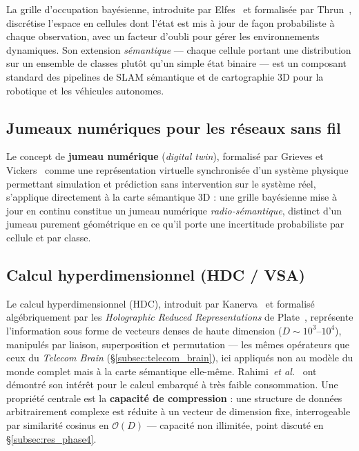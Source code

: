 \documentclass[12pt,a4paper,titlepage]{article}
\begin{document}
La grille d'occupation bayésienne, introduite par Elfes~\cite{elfes_occupancy} et formalisée par Thrun~\cite{thrun_occupancy}, discrétise l'espace en cellules dont l'état est mis à jour de façon probabiliste à chaque observation, avec un facteur d'oubli pour gérer les environnements dynamiques. Son extension \textit{sémantique} --- chaque cellule portant une distribution sur un ensemble de classes plutôt qu'un simple état binaire --- est un composant standard des pipelines de SLAM sémantique et de cartographie 3D pour la robotique et les véhicules autonomes.

\subsection{Jumeaux numériques pour les réseaux sans fil}
\label{subsec:art_twin}

Le concept de \textbf{jumeau numérique} (\textit{digital twin}), formalisé par Grieves et Vickers~\cite{grieves_digital_twin} comme une représentation virtuelle synchronisée d'un système physique permettant simulation et prédiction sans intervention sur le système réel, s'applique directement à la carte sémantique 3D : une grille bayésienne mise à jour en continu constitue un jumeau numérique \textit{radio-sémantique}, distinct d'un jumeau purement géométrique en ce qu'il porte une incertitude probabiliste par cellule et par classe.

\subsection{Calcul hyperdimensionnel (HDC / VSA)}
\label{subsec:art_hdc}

Le calcul hyperdimensionnel (HDC), introduit par Kanerva~\cite{kanerva_hdc} et formalisé algébriquement par les \textit{Holographic Reduced Representations} de Plate~\cite{plate_hrr}, représente l'information sous forme de vecteurs denses de haute dimension ($D\sim10^3$--$10^4$), manipulés par liaison, superposition et permutation --- les mêmes opérateurs que ceux du \textit{Telecom Brain} (\S\ref{subsec:telecom_brain}), ici appliqués non au modèle du monde complet mais à la carte sémantique elle-même. Rahimi~\textit{et al.}~\cite{rahimi_hdc} ont démontré son intérêt pour le calcul embarqué à très faible consommation. Une propriété centrale est la \textbf{capacité de compression} : une structure de données arbitrairement complexe est réduite à un vecteur de dimension fixe, interrogeable par similarité cosinus en $\mathcal{O}(D)$ --- capacité non illimitée, point discuté en \S\ref{subsec:res_phase4}.
\end{document}
